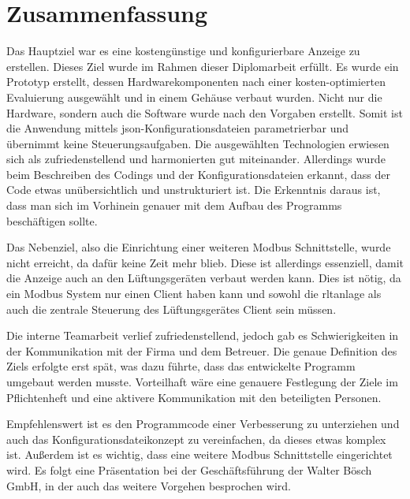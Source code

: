 \ifoot{\leftmark}
\chapter{Zusammenfassung}
\noindent Das Hauptziel war es eine kostengünstige und konfigurierbare Anzeige zu erstellen. Dieses Ziel wurde im Rahmen dieser Diplomarbeit erfüllt. Es wurde ein Prototyp erstellt, dessen Hardwarekomponenten nach einer kosten-optimierten Evaluierung ausgewählt und in einem Gehäuse verbaut wurden. Nicht nur die Hardware, sondern auch die Software wurde nach den Vorgaben erstellt. Somit ist die Anwendung mittels \acs{json}-Konfigurationsdateien parametrierbar und übernimmt keine Steuerungsaufgaben. Die ausgewählten Technologien erwiesen sich als zufriedenstellend und harmonierten gut miteinander. Allerdings wurde beim Beschreiben des Codings und der Konfigurationsdateien erkannt, dass der Code etwas unübersichtlich und unstrukturiert ist. Die Erkenntnis daraus ist, dass man sich im Vorhinein genauer mit dem Aufbau des Programms beschäftigen sollte.

Das Nebenziel, also die Einrichtung einer weiteren Modbus Schnittstelle, wurde nicht erreicht, da dafür keine Zeit mehr blieb. Diese ist allerdings essenziell, damit die Anzeige auch an den Lüftungsgeräten verbaut werden kann. Dies ist nötig, da ein Modbus System nur einen Client haben kann und sowohl die \acs{rltanlage} als auch die zentrale Steuerung des Lüftungsgerätes Client sein müssen.

Die interne Teamarbeit verlief zufriedenstellend, jedoch gab es Schwierigkeiten in der Kommunikation mit der Firma und dem Betreuer. Die genaue Definition des Ziels erfolgte erst spät, was dazu führte, dass das entwickelte Programm umgebaut werden musste. Vorteilhaft wäre eine genauere Festlegung der Ziele im Pflichtenheft und eine aktivere Kommunikation mit den beteiligten Personen.

Empfehlenswert ist es den Programmcode einer Verbesserung zu unterziehen und auch das Konfigurationsdateikonzept zu vereinfachen, da dieses etwas komplex ist. Außerdem ist es wichtig, dass eine weitere Modbus Schnittstelle eingerichtet wird.
Es folgt eine Präsentation bei der Geschäftsführung der Walter Bösch GmbH, in der auch das weitere Vorgehen besprochen wird.